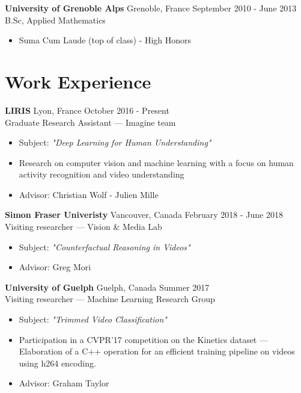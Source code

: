 \documentclass[10pt]{res} %
\begin{document}
\begin{resume}
\textbf{University of Grenoble Alps} \hfill Grenoble, France \hfill September 2010 - June 2013 \\
B.Sc, Applied Mathematics
\begin{itemize}
\item Suma Cum Laude (top of class) - High Honors
\end{itemize}
 

\section{\large Work Experience} 


\textbf{LIRIS} \hfill Lyon, France \hfill October 2016 - Present \\
Graduate Research Assistant --- Imagine team
\begin{itemize}
\item Subject: \textit{"Deep Learning for Human Understanding"}
\item Research on computer vision and machine learning with a focus on human activity recognition and video understanding
\item Advisor: Christian Wolf - Julien Mille
\end{itemize}

\textbf{Simon Fraser Univeristy} \hfill Vancouver, Canada \hfill February 2018 - June 2018 \\
Visiting researcher --- Vision \& Media Lab
\begin{itemize}
\item Subject: \textit{"Counterfactual Reasoning in Videos" }
\item Advisor: Greg Mori
\end{itemize}

 \newpage


\textbf{University of Guelph} \hfill Guelph, Canada \hfill Summer 2017 \\
Visiting researcher --- Machine Learning Research Group
\begin{itemize}
\item Subject: \textit{"Trimmed Video Classification"}
\item Participation in a CVPR'17 competition on the Kinetics dataset --- Elaboration of a C++ operation for an efficient training  pipeline on videos using h264 encoding.
\item Advisor: Graham Taylor
\end{itemize}




\end{resume}
\end{document}
